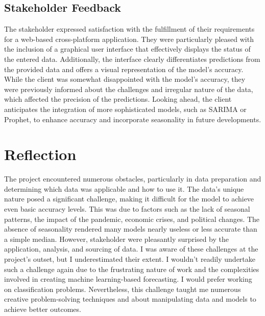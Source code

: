 \documentclass{article}
\begin{document}
\subsection{Stakeholder Feedback}
The stakeholder expressed satisfaction with the fulfillment of their requirements for a web-based cross-platform application. They were particularly pleased with the inclusion of a graphical user interface that effectively displays the status of the entered data. Additionally, the interface clearly differentiates predictions from the provided data and offers a visual representation of the model's accuracy. While the client was somewhat disappointed with the model's accuracy, they were previously informed about the challenges and irregular nature of the data, which affected the precision of the predictions. Looking ahead, the client anticipates the integration of more sophisticated models, such as SARIMA or Prophet, to enhance accuracy and incorporate seasonality in future developments.


\section{Reflection}
The project encountered numerous obstacles, particularly in data preparation and determining which data was applicable and how to use it. The data's unique nature posed a significant challenge, making it difficult for the model to achieve even basic accuracy levels. This was due to factors such as the lack of seasonal patterns, the impact of the pandemic, economic crises, and political changes. The absence of seasonality rendered many models nearly useless or less accurate than a simple median. However, stakeholder were pleasantly surprised by the application, analysis, and sourcing of data. I was aware of these challenges at the project's outset, but I underestimated their extent. I wouldn't readily undertake such a challenge again due to the frustrating nature of work and the complexities involved in creating machine learning-based forecasting. I would prefer working on classification problems. Nevertheless, this challenge taught me numerous creative problem-solving techniques and about manipulating data and models to achieve better outcomes.
\end{document}
